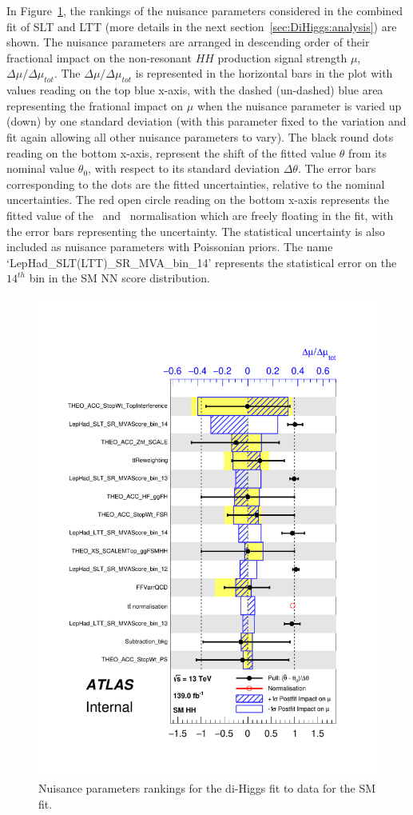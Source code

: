 In Figure~\ref{fig:LepHadPostfitNPRankingsSM},
the rankings of the nuisance parameters considered in the
combined fit of SLT and LTT (more details in the next section~\ref{sec:DiHiggs:analysis}) 
are shown. The nuisance parameters are arranged in descending order
of their fractional impact on the non-resonant $HH$ production signal strength $\mu$,
$\Delta\mu/\Delta\mu_{tot}$. The $\Delta\mu/\Delta\mu_{tot}$ is represented in
the horizontal bars in the plot with values reading on the top blue x-axis, with the 
dashed (un-dashed) blue area representing the frational impact on $\mu$ 
when the nuisance parameter is varied up (down) by one standard deviation (with
this parameter fixed to the variation and fit again allowing all other nuisance parameters to 
vary). The black round dots reading on the bottom x-axis, 
represent the shift of the fitted value $\theta$
from its nominal value $\theta_0$, with respect to its standard deviation $\Delta\theta$.
The error bars corresponding to the dots are the fitted uncertainties, relative to 
the nominal uncertainties.  The red open circle reading on the bottom x-axis
represents the fitted value 
of the \ttbar\ and \ZHF\ normalisation which are freely floating in the fit,
with the error bars representing the uncertainty. 
The statistical uncertainty is also included as nuisance parameters with Poissonian priors.
The name `LepHad\_SLT(LTT)\_SR\_MVA\_bin\_14' represents the statistical error on 
the $14^{th}$ bin in the SM NN score distribution.
\begin{figure}
\centering
\includegraphics[width=.8\textwidth]{figures/results/HH/LepHad/pulls_SigXsecOverSM_125.pdf}
\caption{Nuisance parameters rankings for the di-Higgs \lephad fit to data for the SM fit.
}
\label{fig:LepHadPostfitNPRankingsSM}
\end{figure}